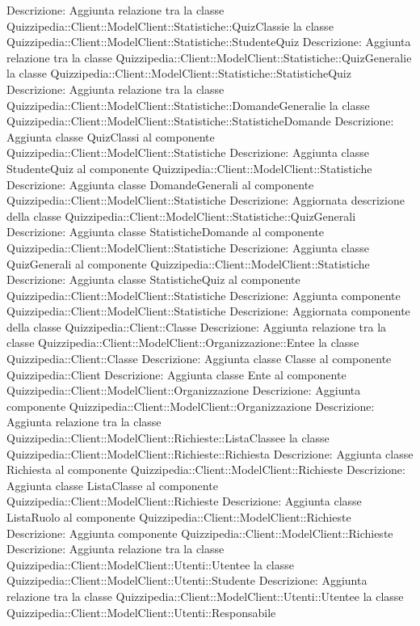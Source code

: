 Descrizione: Aggiunta relazione tra la classe Quizzipedia::Client::ModelClient::Statistiche::QuizClassie la classe Quizzipedia::Client::ModelClient::Statistiche::StudenteQuiz 
Descrizione: Aggiunta relazione tra la classe Quizzipedia::Client::ModelClient::Statistiche::QuizGeneralie la classe Quizzipedia::Client::ModelClient::Statistiche::StatisticheQuiz 
Descrizione: Aggiunta relazione tra la classe Quizzipedia::Client::ModelClient::Statistiche::DomandeGeneralie la classe Quizzipedia::Client::ModelClient::Statistiche::StatisticheDomande 
Descrizione: Aggiunta classe QuizClassi al componente Quizzipedia::Client::ModelClient::Statistiche 
Descrizione: Aggiunta classe StudenteQuiz al componente Quizzipedia::Client::ModelClient::Statistiche 
Descrizione: Aggiunta classe DomandeGenerali al componente Quizzipedia::Client::ModelClient::Statistiche 
Descrizione: Aggiornata descrizione della classe Quizzipedia::Client::ModelClient::Statistiche::QuizGenerali 
Descrizione: Aggiunta classe StatisticheDomande al componente Quizzipedia::Client::ModelClient::Statistiche 
Descrizione: Aggiunta classe QuizGenerali al componente Quizzipedia::Client::ModelClient::Statistiche 
Descrizione: Aggiunta classe StatisticheQuiz al componente Quizzipedia::Client::ModelClient::Statistiche 
Descrizione: Aggiunta componente Quizzipedia::Client::ModelClient::Statistiche 
Descrizione: Aggiornata componente della classe Quizzipedia::Client::Classe 
Descrizione: Aggiunta relazione tra la classe Quizzipedia::Client::ModelClient::Organizzazione::Entee la classe Quizzipedia::Client::Classe 
Descrizione: Aggiunta classe Classe al componente Quizzipedia::Client 
Descrizione: Aggiunta classe Ente al componente Quizzipedia::Client::ModelClient::Organizzazione 
Descrizione: Aggiunta componente Quizzipedia::Client::ModelClient::Organizzazione 
Descrizione: Aggiunta relazione tra la classe Quizzipedia::Client::ModelClient::Richieste::ListaClassee la classe Quizzipedia::Client::ModelClient::Richieste::Richiesta 
Descrizione: Aggiunta classe Richiesta al componente Quizzipedia::Client::ModelClient::Richieste 
Descrizione: Aggiunta classe ListaClasse al componente Quizzipedia::Client::ModelClient::Richieste 
Descrizione: Aggiunta classe ListaRuolo al componente Quizzipedia::Client::ModelClient::Richieste 
Descrizione: Aggiunta componente Quizzipedia::Client::ModelClient::Richieste 
Descrizione: Aggiunta relazione tra la classe Quizzipedia::Client::ModelClient::Utenti::Utentee la classe Quizzipedia::Client::ModelClient::Utenti::Studente 
Descrizione: Aggiunta relazione tra la classe Quizzipedia::Client::ModelClient::Utenti::Utentee la classe Quizzipedia::Client::ModelClient::Utenti::Responsabile 
